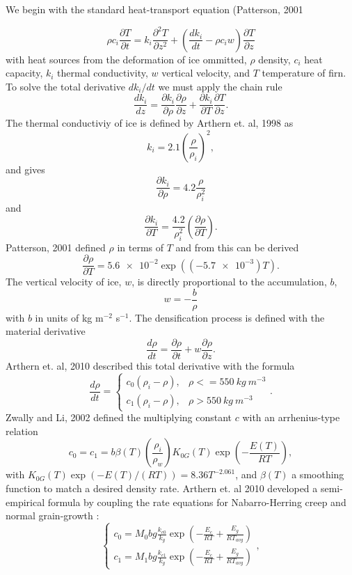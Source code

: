 \documentclass{article}%
\begin{document}
We begin with the standard heat-transport equation (Patterson, 2001

  $$
  \rho c_i \frac{\partial T}{\partial t} = 
    k_i \frac{\partial^2 T}{\partial z^2} +
    \left( \frac{dk_i}{dt} - \rho c_i w \right) \frac{\partial T}{\partial z}
  $$
with heat sources from the deformation of ice ommitted, $\rho$ density, $c_i$ heat capacity, $k_i$ thermal conductivity, $w$ vertical velocity, and $T$ temperature of firn.  To solve the total derivative $dk_i/dt$ we must apply the chain rule
  $$
  \frac{dk_i}{dz} = 
  \frac{\partial k_i}{\partial \rho} \frac{\partial \rho}{\partial z} + 
  \frac{\partial k_i}{\partial T} \frac{\partial T}{\partial z}.
  $$
The thermal conductiviy of ice is defined by Arthern et. al, 1998 as
  $$k_i = 2.1 \left(\frac{\rho}{\rho_i}\right)^2,$$
and gives
  $$
  \frac{\partial k_i}{\partial \rho} = 
    4.2 \frac{\rho}{\rho_i^2}
  $$
and
  $$
  \frac{\partial k_i}{\partial T} = 
    \frac{4.2}{\rho_i^2} \left( \frac{\partial \rho}{\partial T} \right).
  $$
Patterson, 2001 defined $\rho$ in terms of $T$ and from this can be derived
  $$
  \frac{\partial \rho}{\partial T} = 
    \SI{5.6e-2} \exp ((\SI{-5.7e-3})T).
  $$
The vertical velocity of ice, $w$, is directly proportional to the accumulation, $b$,
  $$
  w = -\frac{b}{\rho}
  $$
with $b$ in units of kg m$^{-2}$ s$^{-1}$.  The densification process is defined with the material derivative
  $$\frac{d \rho}{dt} = \frac{\partial \rho}{\partial t} + 
    w\frac{\partial \rho}{\partial z}.$$
Arthern et. al, 2010 described this total derivative with the formula  
  $$
  \frac{d \rho}{dt} = 
  \begin{cases}
   c_0(\rho_i - \rho), &\rho <= 550\ kg\ m^{-3}\\
   c_1(\rho_i - \rho), &\rho > 550\ kg\ m^{-3}
  \end{cases}.$$
Zwally and Li, 2002 defined the multiplying constant $c$ with an arrhenius-type relation
  $$
  c_0 = c_1 = 
  b \beta(T)\left(\frac{\rho_i}{\rho_w}\right)
  K_{0G}(T)\exp \left( -\frac{E(T)}{RT} \right),
  $$
with $K_{0G}(T) \exp(-E(T)/(RT)) = 8.36T^{-2.061}$, and $\beta(T)$ a smoothing function to match a desired density rate.  Arthern et. al 2010 developed a semi-empirical formula by coupling the rate equations for Nabarro-Herring creep and normal grain-growth : 
  $$
  \begin{cases}
    c_0 = M_0 bg\frac{k_{c0}}{k_g}\exp\left(-\frac{E_c}{RT} + 
          \frac{E_g}{RT_{avg}}\right)\\
    c_1 = M_1 bg\frac{k_{c1}}{k_g}\exp\left(-\frac{E_c}{RT} + 
          \frac{E_g}{RT_{avg}}\right)
  \end{cases},
  $$
\end{document}
